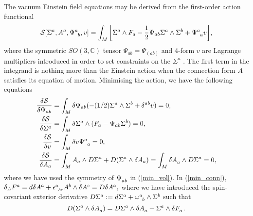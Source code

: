 \documentclass[a4paper,12pt, onecolumn, notitlepage]{article}
\theoremstyle{definition}
\theoremstyle{remark}
\newcommand{\w}{\omega}
\newcommand{\e}{\epsilon}
\begin{document}
The vacuum Einstein field equations may be derived from the first-order action functional
\begin{equation}
\label{action}
\mathcal{S}[\Sigma^{a}, A^{a}, \Psi\indices{^a_b}, v] = \int_{M}\bigg[\Sigma^{a}\wedge F_{a} - \frac{1}{2}\Psi_{ab}\Sigma^{a}\wedge\Sigma^{b} + \Psi\indices{^a_a}v\bigg],
\end{equation}
where the symmetric $SO(3,\mathbb{C})$ tensor $\Psi_{ab}=\Psi_{(ab)}$ and 4-form $v$ are Lagrange multipliers introduced in order to set constraints on the $\Sigma^{a}$ \cite{capovilla_1989}. The first term in the integrand is nothing more than the Einstein action when the connection form $A$ satisfies its equation of motion. Minimising the action, we have the following equations
\begin{subequations}
\begin{align}
	\label{min_sym}
	\frac{\delta\mathcal{S}}{\delta\Psi_{ab}} &= \int_{M}\delta\Psi_{ab}(- (1/2)\Sigma^{a}\wedge\Sigma^{b} + \delta^{ab}v) = 0,\\
	\label{min_form}
	\frac{\delta\mathcal{S}}{\delta\Sigma^{a}} &= \int_{M}\delta\Sigma^{a}\wedge(F_{a} - \Psi_{ab}\Sigma^{b}) = 0,\\
	\label{min_vol}
	\frac{\delta\mathcal{S}}{\delta v} &= \int_{M}\delta v\Psi\indices{^a_a} = 0,\\
	\label{min_conn}
	\frac{\delta\mathcal{S}}{\delta A_{a}} &= \int_{M}A_{a}\wedge D\Sigma^{a} + D(\Sigma^{a}\wedge\delta A_{a}) = \int_{M}\delta A\indices{_a}\wedge D\Sigma\indices{^a} = 0,
	\end{align}
\end{subequations}
where we have used the symmetry of $\Psi\indices{_a_b}$ in (\ref{min_vol}). In (\ref{min_conn}), $\delta_{A} F\indices{^a}=d\delta A\indices{^a}+\e\indices{^a_b_c}A\indices{^b}\wedge \delta A\indices{^c} = D\delta A\indices{^a},$ where we have introduced the spin-covariant exterior derivative $D\Sigma\indices{^a} := d\Sigma\indices{^a}+ \w\indices{^a_b}\wedge\Sigma\indices{^b}$ such that
\begin{equation*}
	D(\Sigma\indices{^a}\wedge\delta A\indices{_a})=D\Sigma\indices{^a}\wedge\delta A\indices{_a} - \Sigma\indices{^a}\wedge \delta F\indices{_a}.
\end{equation*}
\end{document}

